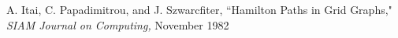 \documentclass[letterpaper, 12pt, leqno]{report}
\begin{document}
\noindent [10] A. Itai, C. Papadimitrou, and J. Szwarcfiter, ``Hamilton Paths in Grid Graphs," \textit{SIAM Journal on Computing,}  November 1982



\end{document}
